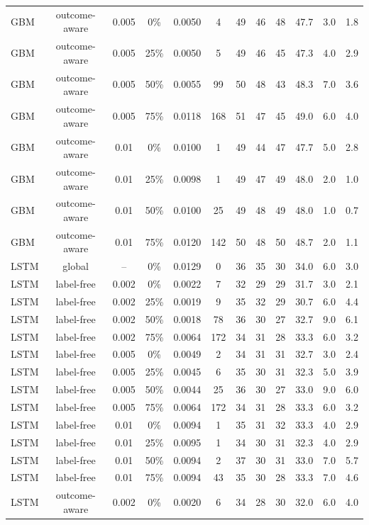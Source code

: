 \documentclass[10pt,onecolumn,letterpaper]{article}
\begin{document}
\begin{table}[!t]
{\begin{tabular}{lccccccccccc}
GBM & outcome-aware & 0.005 & 0\% & 0.0050 & 4 & 49 & 46 & 48 & 47.7 & 3.0 & 1.8 \\
GBM & outcome-aware & 0.005 & 25\% & 0.0050 & 5 & 49 & 46 & 45 & 47.3 & 4.0 & 2.9 \\
GBM & outcome-aware & 0.005 & 50\% & 0.0055 & 99 & 50 & 48 & 43 & 48.3 & 7.0 & 3.6 \\
GBM & outcome-aware & 0.005 & 75\% & 0.0118 & 168 & 51 & 47 & 45 & 49.0 & 6.0 & 4.0 \\
GBM & outcome-aware & 0.01 & 0\% & 0.0100 & 1 & 49 & 44 & 47 & 47.7 & 5.0 & 2.8 \\
GBM & outcome-aware & 0.01 & 25\% & 0.0098 & 1 & 49 & 47 & 49 & 48.0 & 2.0 & 1.0 \\
GBM & outcome-aware & 0.01 & 50\% & 0.0100 & 25 & 49 & 48 & 49 & 48.0 & 1.0 & 0.7 \\
GBM & outcome-aware & 0.01 & 75\% & 0.0120 & 142 & 50 & 48 & 50 & 48.7 & 2.0 & 1.1 \\
LSTM & global & -- & 0\% & 0.0129 & 0 & 36 & 35 & 30 & 34.0 & 6.0 & 3.0 \\
LSTM & label-free & 0.002 & 0\% & 0.0022 & 7 & 32 & 29 & 29 & 31.7 & 3.0 & 2.1 \\
LSTM & label-free & 0.002 & 25\% & 0.0019 & 9 & 35 & 32 & 29 & 30.7 & 6.0 & 4.4 \\
LSTM & label-free & 0.002 & 50\% & 0.0018 & 78 & 36 & 30 & 27 & 32.7 & 9.0 & 6.1 \\
LSTM & label-free & 0.002 & 75\% & 0.0064 & 172 & 34 & 31 & 28 & 33.3 & 6.0 & 3.2 \\
LSTM & label-free & 0.005 & 0\% & 0.0049 & 2 & 34 & 31 & 31 & 32.7 & 3.0 & 2.4 \\
LSTM & label-free & 0.005 & 25\% & 0.0045 & 6 & 35 & 30 & 31 & 32.3 & 5.0 & 3.9 \\
LSTM & label-free & 0.005 & 50\% & 0.0044 & 25 & 36 & 30 & 27 & 33.0 & 9.0 & 6.0 \\
LSTM & label-free & 0.005 & 75\% & 0.0064 & 172 & 34 & 31 & 28 & 33.3 & 6.0 & 3.2 \\
LSTM & label-free & 0.01 & 0\% & 0.0094 & 1 & 35 & 31 & 32 & 33.3 & 4.0 & 2.9 \\
LSTM & label-free & 0.01 & 25\% & 0.0095 & 1 & 34 & 30 & 31 & 32.3 & 4.0 & 2.9 \\
LSTM & label-free & 0.01 & 50\% & 0.0094 & 2 & 37 & 30 & 31 & 33.0 & 7.0 & 5.7 \\
LSTM & label-free & 0.01 & 75\% & 0.0094 & 43 & 35 & 30 & 28 & 33.3 & 7.0 & 4.6 \\
LSTM & outcome-aware & 0.002 & 0\% & 0.0020 & 6 & 34 & 28 & 30 & 32.0 & 6.0 & 4.0 \\

\end{tabular}}
\end{table}
\end{document}
